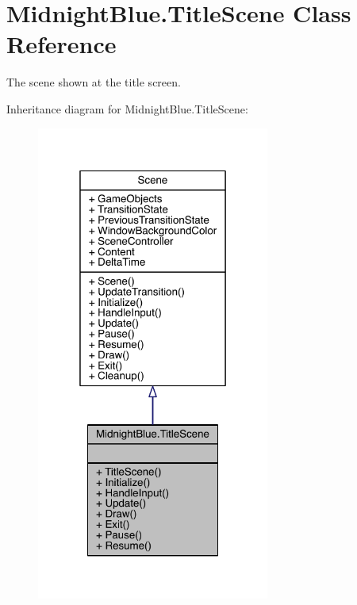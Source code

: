 \hypertarget{class_midnight_blue_1_1_title_scene}{}\section{Midnight\+Blue.\+Title\+Scene Class Reference}
\label{class_midnight_blue_1_1_title_scene}


The scene shown at the title screen.  




Inheritance diagram for Midnight\+Blue.\+Title\+Scene\+:\nopagebreak
\begin{figure}[H]
\begin{center}
\leavevmode
\includegraphics[width=217pt]{class_midnight_blue_1_1_title_scene__inherit__graph}
\end{center}
\end{figure}


